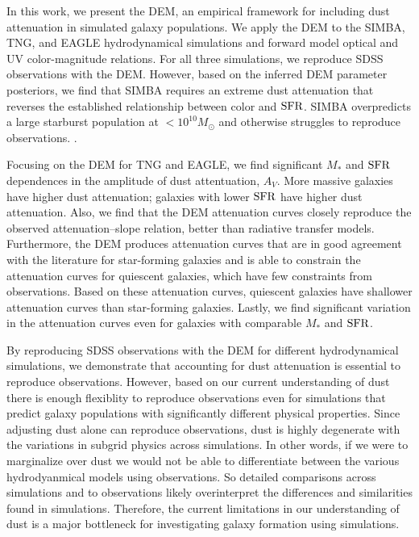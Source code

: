 In this work, we present the DEM, an empirical framework for including dust
attenuation in simulated galaxy populations. We apply the DEM to the SIMBA,
TNG, and EAGLE hydrodynamical simulations and forward model optical and UV
color-magnitude relations. %
For all three simulations, we reproduce SDSS observations with the DEM.
However, based on the inferred DEM parameter posteriors, we find that 
SIMBA requires an extreme dust attenuation that reverses the established 
relationship between color and ${\rm SFR}$. SIMBA overpredicts a large starburst
population at $<10^{10}M_\odot$ and otherwise struggles to reproduce
observations. .

Focusing on the DEM for TNG and EAGLE, we find significant $M_*$ and ${\rm SFR}$
dependences in the amplitude of dust attentuation, $A_V$. More massive
galaxies have higher dust attenuation; galaxies with lower 
${\rm SFR}$ have  higher dust attenuation. Also, we find that the DEM attenuation
curves closely reproduce the observed attenuation--slope relation, better than
radiative transfer models. Furthermore, the DEM produces attenuation curves
that are in good agreement with the literature for star-forming galaxies and is
able to constrain the attenuation curves for quiescent galaxies, which have few
constraints from observations. Based on these attenuation curves, quiescent
galaxies have shallower attenuation curves than star-forming galaxies. Lastly,
we find significant variation in the attenuation curves even for galaxies with
comparable $M_*$ and ${\rm SFR}$.

By reproducing SDSS observations with the DEM for different hydrodynamical
simulations, we demonstrate that accounting for dust attenuation is essential 
to reproduce observations. However, based on our current understanding of dust
there is enough flexiblity to reproduce observations even for simulations that
predict galaxy populations with significantly different physical properties. Since adjusting dust alone
can reproduce observations, dust is highly degenerate with the variations in
subgrid physics across simulations. In other words, if we were to marginalize
over dust we would not be able to differentiate between the various
hydrodyanmical models using observations. So detailed comparisons across
simulations and to observations likely overinterpret the differences and
similarities found in simulations. Therefore, the current limitations in our
understanding of dust is a major bottleneck for investigating galaxy formation
using simulations.

